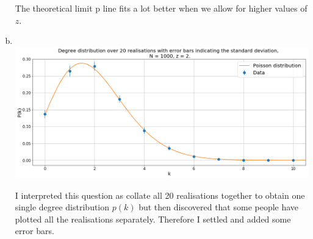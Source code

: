 \documentclass[12pt, twoside, a4paper]{article}
\begin{document}
\begin{enumerate}[a)]
The theoretical limit p line fits a lot better when we allow for higher values of $z$. 


\item 
\text{}\\
\hspace*{-2cm}
\includegraphics[width = 190mm]{degreedistribution}

I interpreted this question as collate all 20 realisations together to obtain one single degree distribution $p(k)$ but then discovered that some people have plotted all the realisations separately. Therefore I settled and added some error bars. 

\end{enumerate}
\end{document}
